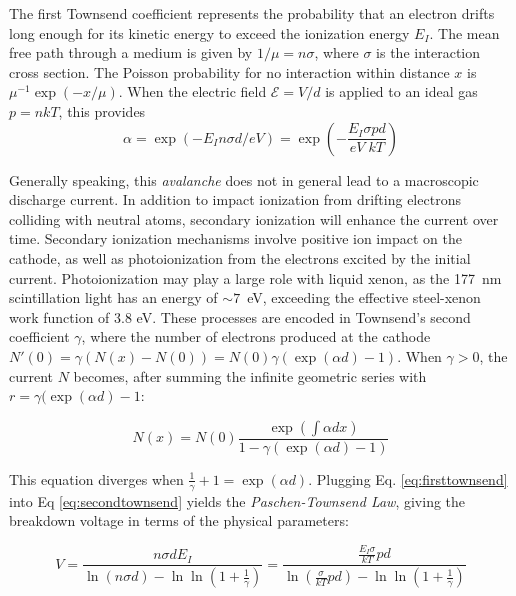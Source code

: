 The first Townsend coefficient represents the probability that an electron drifts long enough for its kinetic energy to exceed the ionization energy $E_I$. 
The mean free path through a medium is given by $1/\mu = n \sigma$, where $\sigma$ is the interaction cross section.
The Poisson probability for no interaction within distance $x$ is $\mu ^{-1} \exp(-x / \mu)$.
When the electric field $\mathcal{E} = V/d$ is applied to an ideal gas $p = n kT$, this provides
\begin{equation}
    \alpha = \exp(-E_I n \sigma d/eV) = \exp(-\frac{E_I  \sigma pd}{eV\;kT})
    \label{eq:firsttownsend}
\end{equation}

Generally speaking, this \textit{avalanche} does not in general lead to a macroscopic discharge current.
In addition to impact ionization from drifting electrons colliding with neutral atoms, secondary ionization will enhance the current over time.
Secondary ionization mechanisms involve positive ion impact on the cathode, as well as photoionization from the electrons excited by the initial current.
Photoionization may play a large role with liquid xenon, as the 177~nm scintillation light has an energy of $\sim7$~eV, exceeding the effective steel-xenon work function of 3.8 eV\cite{wilson_vacuum_1966,tauchert_photoelectric_1977}. 
These processes are encoded in Townsend's second coefficient $\gamma$, where the number of electrons produced at the cathode $N'(0) = \gamma (N(x)-N(0)) = N(0)\gamma (\exp(\alpha d)-1)$.
When $\gamma >0$, the current $N$ becomes, after summing the infinite geometric series with $r = \gamma (\exp(\alpha d)-1$:

\begin{equation}
    N(x) = N(0)\frac{\exp(\int \alpha dx)}{ 1- \gamma(\exp(\alpha d)-1) }
    \label{eq:secondtownsend}
\end{equation}

This equation diverges  when $\frac{1}{\gamma}+1 =\exp(\alpha d)$.
Plugging Eq. \ref{eq:firsttownsend} into Eq \ref{eq:secondtownsend} yields the \textit{Paschen-Townsend Law}, giving the breakdown voltage in terms of the physical parameters:

\begin{equation}
    V = \frac{n \sigma d E_I}{\ln(n \sigma d) - \ln \ln (1 + \frac{1}{\gamma})}= \frac{ \frac{E_I\sigma}{kT} pd }{\ln( \frac{\sigma}{kT} pd) - \ln \ln (1 + \frac{1}{\gamma})}
    \label{eq:paschen_townsend_law}
\end{equation}

